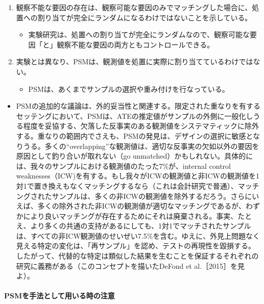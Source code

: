 \begin{enumerate}
 \item 観察不能な要因の存在は、観察可能な要因のみでマッチングした場合に、処置への割り当てが完全にランダムになるわけではないことを示している。
  \begin{itemize}
   \item 実験研究は、処置への割り当てが完全にランダムなので、観察可能な要因「と」観察不能な要因の両方ともコントロールできる。
  \end{itemize}
 \item 実験とは異なり、PSMは、観測値を処置に実際に割り当てているわけではない。
  \begin{itemize}
   \item PSMは、あくまでサンプルの選択や重み付けを行なっている。
  \end{itemize}
\end{enumerate}
 
\begin{itemize}
 \item PSMの追加的な議論は、外的妥当性と関連する。限定された重なりを有するセッテングにおいて、PSMは、ATEの推定値がサンプルの外側に一般化しうる程度を妥協する、欠落した反事実のある観測値をシステマティックに除外する。重なりの範囲内でさえも、PSMの発見は、デザインの選択に敏感となりうる。多くの“overlapping”な観測値は、適切な反事実の欠如以外の要因を原因として釣り合いが取れない（go unmatched）かもしれない。具体的には、我々のサンプルにおける観測値のたった7\%が、internal control weaknesses（ICW)を有する。もし我々がICWの観測値と非ICWの観測値を1対1で置き換えもなくマッチングするなら（これは会計研究で普通）、マッチングされたサンプルは、多くの非ICWの観測値を除外するだろう。さらにいえば、多くの除外された非ICWの観測値が適切なマッチングであるが、わずかにより良いマッチングが存在するためにそれは廃棄される。事実、たとえ、より多くの共通の支持があるにしても、1対1でマッチされたサンプルは、すべての非ICW観測値のせいぜい7.5\%を含む。ゆえに、外見上問題なく見える特定の変化は、「再サンプル」を認め、テストの再現性を毀損する。したがって、代替的な特定は類似した結果を生むことを保証するそれぞれの研究に義務がある（このコンセプトを描いたDeFond et al.［2015］を見よ）。
\end{itemize}

\paragraph{PSMを手法として用いる時の注意}

